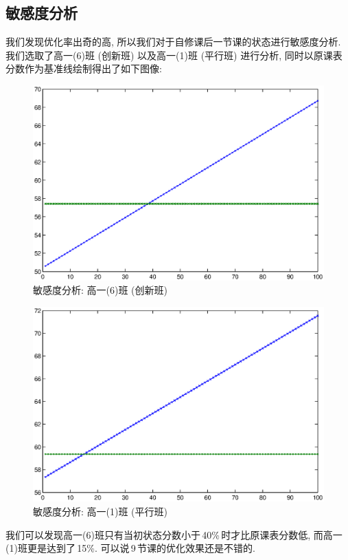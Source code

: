 \documentclass[a4paper]{article}
\begin{document}
 \subsection{敏感度分析}
  我们发现优化率出奇的高, 所以我们对于自修课后一节课的状态进行敏感度分析. 我们选取了高一(6)班 (创新班) 以及高一(1)班 (平行班) 进行分析, 同时以原课表分数作为基准线绘制得出了如下图像:
  \begin{figure}[H]
  \centerline{\includegraphics[scale=0.5]{seninno.eps}}
  \caption{敏感度分析: 高一(6)班 (创新班)}
  \end{figure}
  \begin{figure}[H]
  \centerline{\includegraphics[scale=0.5]{sennorm.eps}}
  \caption{敏感度分析: 高一(1)班 (平行班)}
  \end{figure}
  我们可以发现高一(6)班只有当初状态分数小于\,40\%\,时才比原课表分数低, 而高一(1)班更是达到了\,15\%. 可以说\,9\,节课的优化效果还是不错的.
 \clearpage
\end{document}
